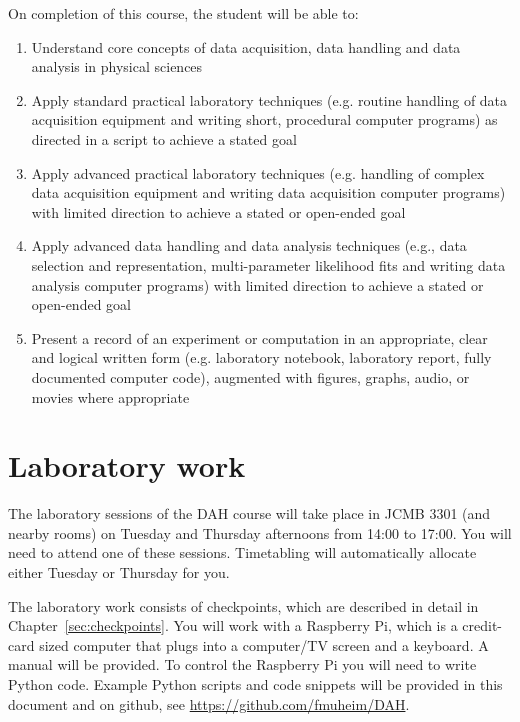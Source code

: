 On completion of this course, the student will be able to:
\begin{enumerate}
\item Understand core concepts of data acquisition, data handling and data analysis in physical sciences
\item Apply standard practical laboratory techniques (e.g. routine handling of data acquisition equipment and writing short, procedural computer programs) as directed in a script to achieve a stated goal
\item Apply advanced practical laboratory techniques (e.g. handling of complex data acquisition equipment and writing data acquisition computer programs) with limited direction to achieve a stated or open-ended goal
\item Apply advanced data handling and data analysis techniques (e.g., data selection and representation, multi-parameter likelihood fits and writing data analysis computer programs) with limited direction to achieve a stated or open-ended goal
\item Present a record of an experiment or computation in an appropriate, clear and logical written form (e.g. laboratory notebook, laboratory report, fully documented computer code), augmented with figures, graphs, audio, or movies where appropriate
\end{enumerate}

\newpage
\section{Laboratory work}

The laboratory sessions of the DAH course will take place in JCMB 3301 (and nearby rooms) on Tuesday and Thursday afternoons from 14:00 to 17:00.%
You will need to attend one of these sessions.
Timetabling will automatically allocate either Tuesday or Thursday for you.

The laboratory work consists of checkpoints, which are described in detail in Chapter~\ref{sec:checkpoints}.
You will work with a Raspberry Pi, which is a credit-card sized computer that plugs into a computer/TV screen and a keyboard.
A manual will be provided.
To control the Raspberry Pi you will need to write Python code.
Example Python scripts and code snippets will be provided in this document and on github, see \url{https://github.com/fmuheim/DAH}. 

